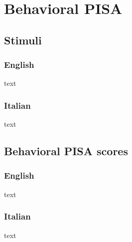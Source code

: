 \setchapterpreamble[u]{\margintoc}
\chapter{Behavioral PISA}

\section{Stimuli}

\subsection{English}

text 

\subsection{Italian}

text 


\section{Behavioral PISA scores}

\subsection{English}

text 

\subsection{Italian}

text 